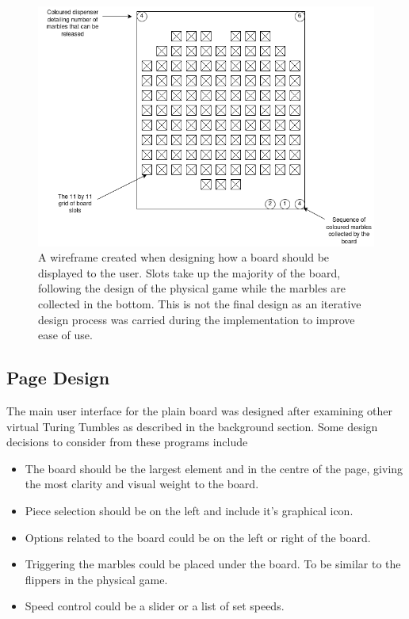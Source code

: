 \documentclass{l4proj}
\begin{document}
\begin{figure}
    \centering
    \includegraphics[width=0.6\linewidth]{images/boardWireframe.png}
    \caption{A wireframe created when designing how a board should be displayed to the user. Slots take up the majority of the board, following the design of the physical game while the marbles are collected in the bottom. This is not the final design as an iterative design process was carried during the implementation to improve ease of use.}
    \label{fig:boardWireframe}
\end{figure}

\subsection{Page Design}
The main user interface for the plain board was designed after examining other virtual Turing Tumbles as described in the background section. Some design decisions to consider from these programs include
\begin{itemize}
    \item The board should be the largest element and in the centre of the page, giving the most clarity and visual weight to the board.
    \item Piece selection should be on the left and include it's graphical icon.
    \item Options related to the board could be on the left or right of the board.
    \item Triggering the marbles could be placed under the board. To be similar to the flippers in the physical game.
    \item Speed control could be a slider or a list of set speeds.
\end{itemize}
\end{document}
